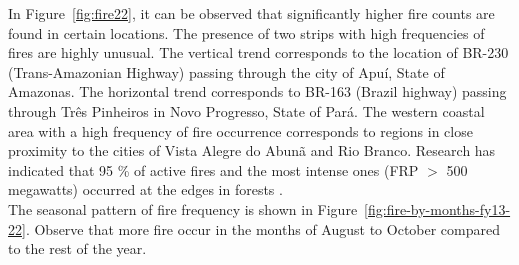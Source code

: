 \documentclass{article}\usepackage[]{graphicx}\usepackage[]{xcolor}
\numberwithin{equation}{section}
\begin{document}
\noindent
In Figure~\ref{fig:fire22}, it can be observed that significantly higher fire counts are found in certain locations. The presence of two strips with high frequencies of fires are highly unusual. The vertical trend corresponds to the location of BR-230 (Trans-Amazonian Highway) passing through the city of Apuí, State of Amazonas. The horizontal trend corresponds to BR-163 (Brazil highway) passing through Três Pinheiros in Novo Progresso, State of Pará. The western coastal area with a high frequency of fire occurrence corresponds to regions in close proximity to the cities of Vista Alegre do Abunã and Rio Branco. Research has indicated that 95 \% of active fires and the most intense ones (FRP $>$ 500 megawatts) occurred at the edges in forests \cite{forest}.\\

\noindent
The seasonal pattern of fire frequency is shown in Figure~\ref{fig:fire-by-months-fy13-22}. Observe that more fire occur in the months of August to October compared to the rest of the year.
\end{document}
